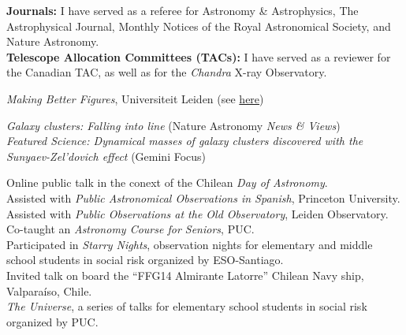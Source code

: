 \documentclass[11pt]{article}
\begin{document}
%


\noindent 
\textbf{Journals:} I have served as a referee for Astronomy \& Astrophysics, The Astrophysical Journal, Monthly Notices of the Royal 
    Astronomical Society, and Nature Astronomy.\\
\noindent
\textbf{Telescope Allocation Committees (TACs):} I have served as a reviewer for the Canadian TAC, as well as for the
    \textit{Chandra} X-ray Observatory.


\noindent
{} \emph{Making Better Figures}, Universiteit Leiden
(see \href{https://home.strw.leidenuniv.nl/~kenworthy/teaching/better_figures/}{here})


\noindent
{} \emph{Galaxy clusters: Falling into line} (Nature Astronomy \emph{News \& Views})\\
 \emph{Featured Science: Dynamical masses of galaxy clusters discovered with the Sunyaev-Zel'dovich effect} (Gemini Focus)


\noindent
{} Online public talk in the conext of the Chilean \textit{Day of Astronomy}.\\
 Assisted with \emph{Public Astronomical Observations in Spanish}, Princeton University.\\
 Assisted with \emph{Public Observations at the Old Observatory}, Leiden Observatory.\\
 Co-taught an \emph{Astronomy Course for Seniors}, PUC.\\
 Participated in \emph{Starry Nights}, observation nights for 
elementary and middle school students in social risk organized by ESO-Santiago.\\
 Invited talk on board the ``FFG14 Almirante Latorre'' Chilean Navy ship, Valpara\'iso, Chile.\\
 \emph{The Universe}, a series of talks for elementary school students in social risk organized by PUC.\\
\end{document}
